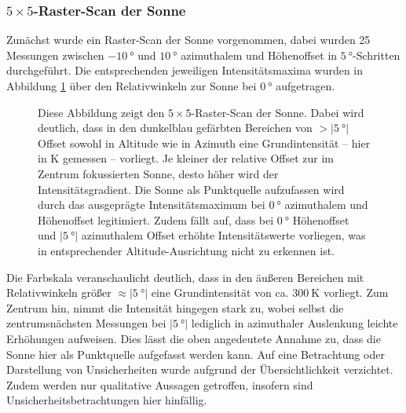 \subsubsection{$5 \times 5$-Raster-Scan der Sonne}
    Zunächst wurde ein Raster-Scan der Sonne vorgenommen, dabei wurden 25 Messungen zwischen $\SI{-10}{\degree}$ und $\SI{10}{\degree}$ azimuthalem und Höhenoffset in $\SI{5}{\degree}$-Schritten durchgeführt.
    Die entsprechenden jeweiligen Intensitätsmaxima wurden in Abbildung \ref{fig:Sonnenabbild} über den Relativwinkeln zur Sonne bei $\SI{0}{\degree}$ aufgetragen.
    \begin{figure}[H]
        \centering
        
        \caption[Raster-Scan der Sonne]{Diese Abbildung zeigt den $5 \times 5$-Raster-Scan der Sonne. Dabei wird deutlich, dass in den dunkelblau gefärbten Bereichen von $>\vert \SI{5}{\degree}\vert$ Offset sowohl in Altitude wie in Azimuth eine Grundintensität -- hier in \si{\kelvin} gemessen -- vorliegt. Je kleiner der relative Offset zur im Zentrum fokussierten Sonne, desto höher wird der Intensitätsgradient. Die Sonne als Punktquelle aufzufassen wird durch das ausgeprägte Intensitätsmaximum bei $\SI{0}{\degree}$ azimuthalem und Höhenoffset legitimiert. Zudem fällt auf, dass bei $\SI{0}{\degree}$ Höhenoffset und $\vert\SI{5}{\degree}\vert$ azimuthalem Offset erhöhte Intensitätswerte vorliegen, was in entsprechender Altitude-Ausrichtung nicht zu erkennen ist.}
        \label{fig:Sonnenabbild}
    \end{figure}
    Die Farbskala veranschaulicht deutlich, dass in den äußeren Bereichen mit Relativwinkeln größer $\approx \vert \SI{5}{\degree}\vert$ eine Grundintensität von ca. $\SI{300}{\kelvin}$ vorliegt.
    Zum Zentrum hin, nimmt die Intensität hingegen stark zu,
    wobei selbst die zentrumsnächsten Messungen bei $\vert\SI{5}{\degree}\vert$ lediglich in azimuthaler Auslenkung leichte Erhöhungen aufweisen.
    Dies lässt die oben angedeutete Annahme zu, dass die Sonne hier als Punktquelle aufgefasst werden kann.
    Auf eine Betrachtung oder Darstellung von Unsicherheiten wurde aufgrund der Übersichtlichkeit verzichtet. Zudem werden nur qualitative Aussagen getroffen, insofern sind Unsicherheitsbetrachtungen hier hinfällig.
